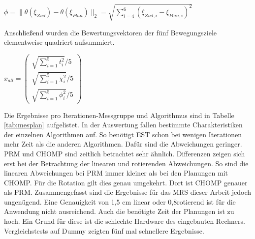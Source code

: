 \begin{math}
	\phi = \|\theta(\xi_{Ziel}) - \theta(\xi_{Plan})\|_2 = \sqrt{\sum_{i=4}^{6}(\xi_{Ziel,i}-\xi_{Plan,i})^2}
\end{math}

Anschließend wurden die Bewertungsvektoren der fünf Bewegungsziele elementweise quadriert aufsummiert.

\begin{math}
	x_{all} = \left(\begin{array}{c}
				\sqrt{\sum_{i=1}^{5} t_i^2}/5\\ 
				\sqrt{\sum_{i=1}^{5} \chi_i^2}/5 \\
				\sqrt{\sum_{i=1}^{5} \phi_i^2}/5 \end{array}\right)	
\end{math}


Die Ergebnisse pro Iterationen-Messgruppe und Algorithmus sind in Tabelle \ref{tab:mesplan} aufgelistet. In der Auswertung fallen bestimmte Charakteristiken der einzelnen Algorithmen auf. So benötigt EST schon bei wenigen Iterationen mehr Zeit als die anderen Algorithmen. Dafür sind die Abweichungen geringer. PRM und CHOMP sind zeitlich betrachtet sehr ähnlich. Differenzen zeigen sich erst bei der Betrachtung der linearen und rotierenden Abweichungen. So sind die linearen Abweichungen bei PRM immer kleiner als bei den Planungen mit CHOMP. Für die Rotation gilt dies genau umgekehrt. Dort ist CHOMP genauer als PRM. Zusammengefasst sind die Ergebnisse für das MRS dieser Arbeit jedoch ungenügend. Eine Genauigkeit von 1,5 cm linear oder 0,8\textdegree rotierend  ist für die Anwendung nicht ausreichend. Auch die benötigte Zeit der Planungen ist zu hoch. Ein Grund für diese ist die schlechte Hardware des eingebauten Rechners. Vergleichstests auf Dummy zeigten fünf mal schnellere Ergebnisse.

